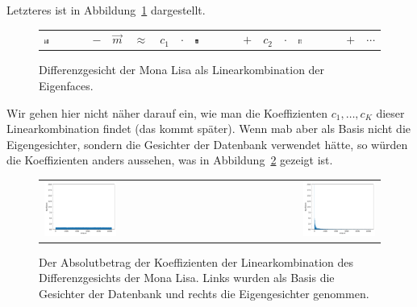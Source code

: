 Letzteres ist in Abbildung~\ref{fig:eigen_basis} dargestellt.
\begin{figure}[ht]
	\centering
	\begin{tabular}{m{1.8cm} c c c c c m{2cm} c c c m{2cm} c c}
		\includegraphics[width=0.1\textwidth]{images/eigenfaces/mona_lisa_original} &
		$-$ & $\vec m$ & $\approx$ & $c_1$ & $\cdot$ & \includegraphics[width=0.1\textwidth]{images/eigenfaces/eigenface00}
		& $+$ & $c_2$ & $\cdot$ & \includegraphics[width=0.1\textwidth]{images/eigenfaces/eigenface01} & $+$ & $\cdots$
	\end{tabular}
	\caption{Differenzgesicht der Mona Lisa als Linearkombination der Eigenfaces.}
	\label{fig:eigen_basis}
\end{figure}
Wir gehen hier nicht näher darauf ein, wie man die Koeffizienten $c_1,\ldots,c_K$ dieser Linearkombination findet (das kommt später).
Wenn mab aber als Basis nicht die Eigengesichter, sondern die Gesichter der Datenbank verwendet hätte, so würden die Koeffizienten anders aussehen, was in Abbildung~\ref{fig:coef} gezeigt ist.
\begin{figure}[ht]
	\centering
	\begin{tabular}{lr}
		\includegraphics[width=0.45\textwidth]{images/eigenfaces/naive_coef} & \includegraphics[width=0.45\textwidth]{images/eigenfaces/eigen_coef} \\
	\end{tabular}
	\caption{Der Absolutbetrag der Koeffizienten der Linearkombination des Differenzgesichts der Mona Lisa. Links wurden als Basis die Gesichter der Datenbank und rechts die Eigengesichter genommen.}
	\label{fig:coef}
\end{figure}
